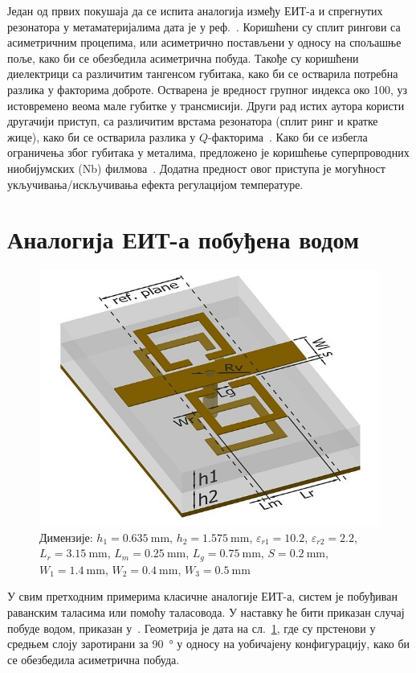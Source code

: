 \documentclass[main.tex]{subfiles}
\begin{document}
Један од првих покушаја да се испита аналогија између ЕИТ-а и спрегнутих резонатора у метаматеријалима дата је у реф.~\cite{tassin:09}. Коришћени су сплит рингови са асиметричним процепима, или асиметрично постављени у односу на спољашње поље, како би се обезбедила асиметрична побуда. Такође су коришћени диелектрици са различитим тангенсом губитака, како би се остварила потребна разлика у факторима доброте. Остварена је вредност групног индекса око 100, уз истовремено веома мале губитке у трансмисији. Други рад истих аутора користи другачији приступ, са различитим врстама резонатора (сплит ринг и кратке жице), како би се остварила разлика у $Q$-факторима~\cite{tassin2009planar}. Како би се избегла ограничења због губитака у металима, предложено је коришћење суперпроводних ниобијумских (Nb) филмова~\cite{cihan}. Додатна предност овог приступа је могућност укључивања/искључивања ефекта регулацијом температуре.

\section{Аналогија ЕИТ-а побуђена водом}%
\label{sec:analogija_eit_a_pobudjena_vodom}

\begin{figure}[h]
    \centering
    \includegraphics[width=0.8\linewidth]{sl_eit/jc2.jpg}
    \caption{Димензије: $h_1=\SI{0.635}{\milli\meter}$, $h_2=\SI{1.575}{\milli\meter}$, $\varepsilon_{r1}=\num{10.2}$, $\varepsilon_{r2}=\num{2.2}$, $L_r=\SI{3.15}{\milli\meter}$, $L_m=\SI{0.25}{\milli\meter}$, $L_g=\SI{0.75}{\milli\meter}$, $S=\SI{0.2}{\milli\meter}$, $W_1=\SI{1.4}{\milli\meter}$, $W_2=\SI{0.4}{\milli\meter}$, $W_3=\SI{0.5}{\milli\meter}$}
    \label{fig:sl_eit/jc2}
\end{figure}
У свим претходним примерима класичне аналогије ЕИТ-а, систем је побуђиван раванским таласима или помоћу таласовода. У наставку ће бити приказан случај побуде водом, приказан у~\cite{mr03:eit}. Геометрија је дата на сл.~\ref{fig:sl_eit/jc2}, где су прстенови у средњем слоју заротирани за \SI{90}{\degree} у односу на уобичајену конфигурацију, како би се обезбедила асиметрична побуда.
\end{document}
